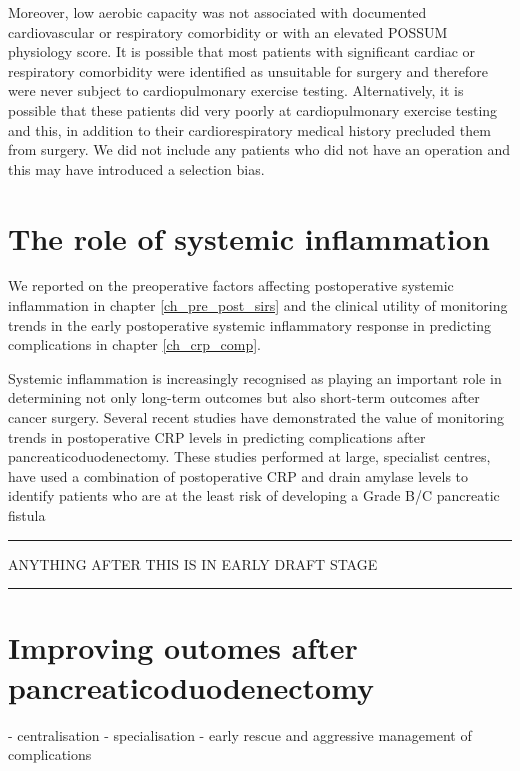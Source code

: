 Moreover, low aerobic capacity was not associated with documented cardiovascular or respiratory comorbidity or with an elevated POSSUM physiology score.
It is possible that most patients with significant cardiac or respiratory comorbidity were identified as unsuitable for surgery and therefore were never subject to cardiopulmonary exercise testing. 
Alternatively, it is possible that these patients did very poorly at cardiopulmonary exercise testing and this, in addition to their cardiorespiratory medical history precluded them from surgery.
We did not include any patients who did not have an operation and this may have introduced a selection bias.

\section{The role of systemic inflammation}
We reported on the preoperative factors affecting postoperative systemic inflammation in chapter \ref{ch_pre_post_sirs} and the clinical utility of monitoring trends in the early postoperative systemic inflammatory response in predicting complications in chapter \ref{ch_crp_comp}.

Systemic inflammation is increasingly recognised as playing an important role in determining not only long-term outcomes but also short-term outcomes after cancer surgery.
Several recent studies have demonstrated the value of monitoring trends in postoperative CRP levels in predicting complications after pancreaticoduodenectomy.
These studies performed at large, specialist centres, have used a combination of postoperative CRP and drain amylase levels to identify patients who are at the least risk of developing a Grade B/C pancreatic fistula \parencite{hiyoshi_usefulness_2013, ansorge_diagnostic_2014, kosaka_multivariate_2014}

\bigskip \hrule

ANYTHING AFTER THIS IS IN EARLY DRAFT STAGE

\bigskip \hrule

\section{Improving outomes after pancreaticoduodenectomy}

- centralisation
- specialisation
- early rescue and aggressive management of complications \parencite{gouma_rates_2000}

